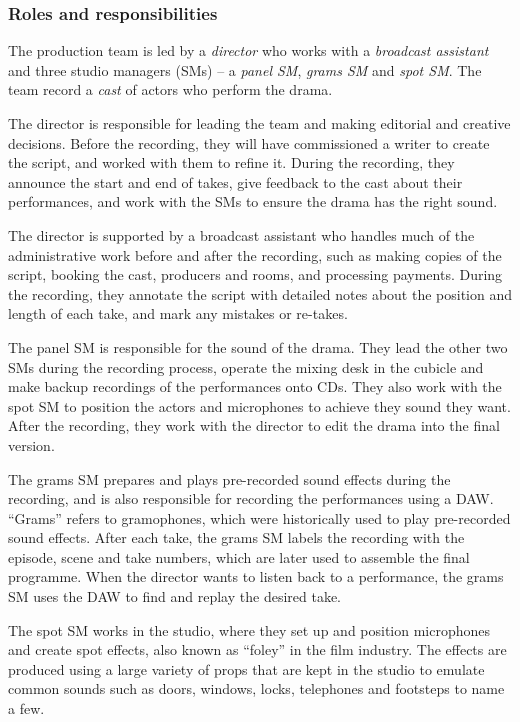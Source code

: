 \subsubsection{Roles and responsibilities}
The production team is led by a \textit{director} who works with a \textit{broadcast assistant} and three studio
managers (SMs) -- a \textit{panel SM}, \textit{grams SM} and \textit{spot SM}. The team record a \textit{cast} of
actors who perform the drama.

The director is responsible for leading the team and making editorial and creative decisions. Before the recording,
they will have commissioned a writer to create the script, and worked with them to refine it. During the recording,
they announce the start and end of takes, give feedback to the cast about their performances, and work with
the SMs to ensure the drama has the right sound.

The director is supported by a broadcast assistant who handles much of the administrative work before and after the
recording, such as making copies of the script, booking the cast, producers and rooms, and processing payments.
During the recording, they annotate the script with detailed notes about the position and length of each take, and mark
any mistakes or re-takes.

The panel SM is responsible for the sound of the drama. They lead the other two SMs during the recording process,
operate the mixing desk in the cubicle and make backup recordings of the performances onto CDs.  They also work with
the spot SM to position the actors and microphones to achieve they sound they want.  After the recording, they work
with the director to edit the drama into the final version.

The grams SM prepares and plays pre-recorded sound effects during the recording, and is also responsible for recording
the performances using a DAW.  ``Grams'' refers to gramophones, which were historically used to play pre-recorded sound
effects.  After each take, the grams SM labels the recording with the episode, scene and take numbers, which are later
used to assemble the final programme.  When the director wants to listen back to a performance, the grams SM uses the
DAW to find and replay the desired take.

The spot SM works in the studio, where they set up and position microphones and create spot
effects, also known as ``foley'' in the film industry. The effects are produced using a large variety of props that
are kept in the studio to emulate common sounds such as doors, windows, locks, telephones and footsteps to name a few.

